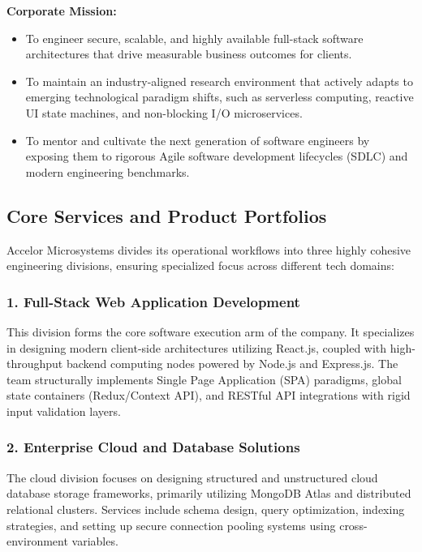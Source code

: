 \documentclass[12pt, a4paper, oneside]{report}
\begin{document}
\textbf{Corporate Mission:}
\begin{itemize}[leftmargin=1.5cm, itemsep=4pt]
    \item To engineer secure, scalable, and highly available full-stack software architectures that drive measurable business outcomes for clients.
    \item To maintain an industry-aligned research environment that actively adapts to emerging technological paradigm shifts, such as serverless computing, reactive UI state machines, and non-blocking I/O microservices.
    \item To mentor and cultivate the next generation of software engineers by exposing them to rigorous Agile software development lifecycles (SDLC) and modern engineering benchmarks.
\end{itemize}

\subsection{Core Services and Product Portfolios}

Accelor Microsystems divides its operational workflows into three highly cohesive engineering divisions, ensuring specialized focus across different tech domains:

\subsubsection{1. Full-Stack Web Application Development}
This division forms the core software execution arm of the company. It specializes in designing modern client-side architectures utilizing React.js, coupled with high-throughput backend computing nodes powered by Node.js and Express.js. The team structurally implements Single Page Application (SPA) paradigms, global state containers (Redux/Context API), and RESTful API integrations with rigid input validation layers.

\subsubsection{2. Enterprise Cloud and Database Solutions}
The cloud division focuses on designing structured and unstructured cloud database storage frameworks, primarily utilizing MongoDB Atlas and distributed relational clusters. Services include schema design, query optimization, indexing strategies, and setting up secure connection pooling systems using cross-environment variables.
\end{document}
